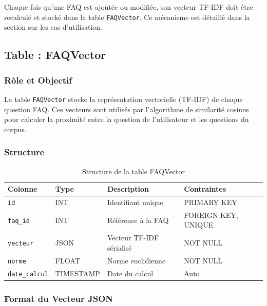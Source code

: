 \documentclass[11pt,a4paper]{article}
\begin{document}
\begin{important}
Chaque fois qu'une FAQ est ajoutée ou modifiée, son vecteur TF-IDF doit être recalculé et stocké dans la table \texttt{FAQVector}. Ce mécanisme est détaillé dans la section sur les cas d'utilisation.
\end{important}

\clearpage

\subsection{Table : FAQVector}

\subsubsection{Rôle et Objectif}

La table \texttt{FAQVector} stocke la représentation vectorielle (TF-IDF) de chaque question FAQ. Ces vecteurs sont utilisés par l'algorithme de similarité cosinus pour calculer la proximité entre la question de l'utilisateur et les questions du corpus.

\subsubsection{Structure}

\begin{table}[H]
\centering
\small
\begin{tabular}{|l|l|l|l|}
\hline
\textbf{Colonne} & \textbf{Type} & \textbf{Description} & \textbf{Contraintes} \\
\hline
\texttt{id} & INT & Identifiant unique & PRIMARY KEY \\
\hline
\texttt{faq\_id} & INT & Référence à la FAQ & FOREIGN KEY, UNIQUE \\
\hline
\texttt{vecteur} & JSON & Vecteur TF-IDF sérialisé & NOT NULL \\
\hline
\texttt{norme} & FLOAT & Norme euclidienne & NOT NULL \\
\hline
\texttt{date\_calcul} & TIMESTAMP & Date du calcul & Auto \\
\hline
\end{tabular}
\caption{Structure de la table FAQVector}
\end{table}

\subsubsection{Format du Vecteur JSON}
\end{document}
